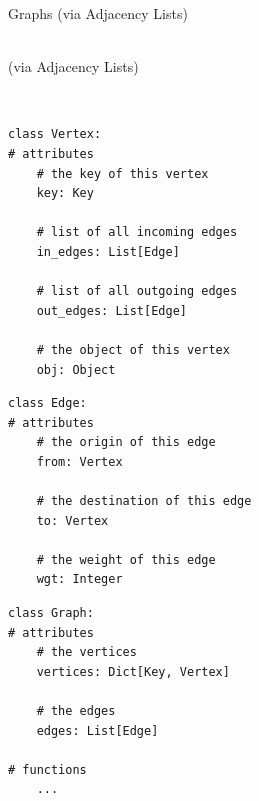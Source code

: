 \documentclass[mathserif, handout]{beamer}
\begin{document}
\begin{frame}{Graphs (via Adjacency Lists)}
	\begin{center}
		\Large {} \\[1mm]
		\normalsize\color{gray} (via Adjacency Lists)
	\end{center}
\end{frame}

\begin{frame}[fragile]
	\begin{thmboxtop}
		 \\
		\begin{lstlisting}[style=mypython]
class Vertex:
# attributes    
    # the key of this vertex
    key: Key
    
    # list of all incoming edges
    in_edges: List[Edge]

    # list of all outgoing edges
    out_edges: List[Edge]

    # the object of this vertex
    obj: Object
\end{lstlisting}
	\end{thmboxtop}
\end{frame}

\begin{frame}[fragile]
	\begin{thmboxside}
		\begin{lstlisting}[style=mypython, firstnumber=last]
class Edge:
# attributes    
    # the origin of this edge
    from: Vertex
    
    # the destination of this edge
    to: Vertex
    
    # the weight of this edge
    wgt: Integer
\end{lstlisting}
	\end{thmboxside}
\end{frame}

\begin{frame}[fragile]
	\begin{thmboxbot}
		\begin{lstlisting}[style=mypython, firstnumber=last]
class Graph:
# attributes
    # the vertices
    vertices: Dict[Key, Vertex]

    # the edges
    edges: List[Edge]

# functions
    ...
\end{lstlisting}
	\end{thmboxbot}
\end{frame}
\end{document}
